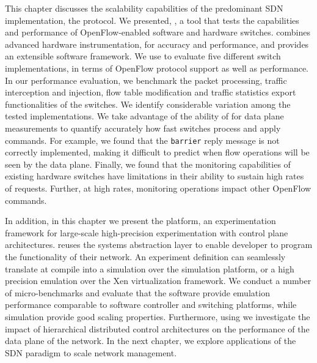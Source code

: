 This chapter discusses the scalability capabilities of the predominant SDN
implementation, the \of protocol.  We presented, \oflops, a tool that tests the
capabilities and performance of OpenFlow-enabled software and hardware switches.
\oflops combines advanced hardware instrumentation, for accuracy and
performance, and provides an extensible software framework. We use \oflops to
evaluate five different \of switch implementations, in terms of OpenFlow
protocol support as well as performance.  In our performance evaluation, we
benchmark the packet processing, traffic interception and injection, flow table
modification and traffic statistics export functionalities of the switches.  We
identify considerable variation among the tested \of implementations.  We take
advantage of the ability of \oflops for data plane measurements to quantify
accurately how fast switches process and apply \of commands.  For example, we
found that the \texttt{barrier} reply message is not correctly implemented,
making it difficult to predict when flow operations will be seen by the data
plane.  Finally, we found that the monitoring capabilities of existing hardware
switches have limitations in their ability to sustain high rates of requests.
Further, at high rates, monitoring operations impact other OpenFlow commands.

In addition, in this chapter we present the \sdnsim platform, an experimentation
framework for large-scale high-precision experimentation with control plane
architectures. \sdnsim reuses the \mirage systems abstraction layer to enable
developer to program the functionality of their network. An \sdnsim experiment
definition can seamlessly translate at compile into a simulation over the 
simulation platform, or a high precision emulation over the Xen virtualization
framework. We conduct a number of micro-benchmarks and evaluate that the
software provide emulation performance comparable to software \of controller and
switching platforms, while \sdnsim simulation provide good scaling properties.
Furthermore, using \sdnsim we investigate the impact of hierarchical distributed
control architectures on the performance of the data plane of the network.  In
the next chapter, we explore applications of the SDN paradigm to scale network
management. 



